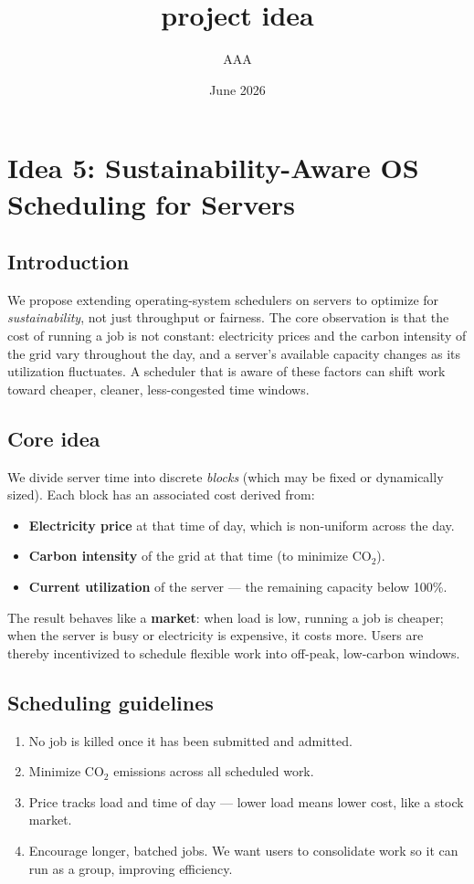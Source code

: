 \documentclass{article}
\title{project idea}
\author{AAA }
\date{June 2026}
\begin{document}
\section{Idea 5: Sustainability-Aware OS Scheduling for Servers}

\subsection*{Introduction}
We propose extending operating-system schedulers on servers to optimize for
\emph{sustainability}, not just throughput or fairness. The core observation is that the cost
of running a job is not constant: electricity prices and the carbon intensity of the grid
vary throughout the day, and a server's available capacity changes as its utilization
fluctuates. A scheduler that is aware of these factors can shift work toward cheaper,
cleaner, less-congested time windows.

\subsection*{Core idea}
We divide server time into discrete \emph{blocks} (which may be fixed or dynamically sized).
Each block has an associated cost derived from:
\begin{itemize}
\item \textbf{Electricity price} at that time of day, which is non-uniform across the day.
\item \textbf{Carbon intensity} of the grid at that time (to minimize CO$_2$).
\item \textbf{Current utilization} of the server --- the remaining capacity below 100\%.
\end{itemize}

\noindent The result behaves like a \textbf{market}: when load is low, running a job is
cheaper; when the server is busy or electricity is expensive, it costs more. Users are
thereby incentivized to schedule flexible work into off-peak, low-carbon windows.

\subsection*{Scheduling guidelines}
\begin{enumerate}
\item No job is killed once it has been submitted and admitted.
\item Minimize CO$_2$ emissions across all scheduled work.
\item Price tracks load and time of day --- lower load means lower cost, like a stock market.
\item Encourage longer, batched jobs. We want users to consolidate work so it can run as a
group, improving efficiency.
\end{enumerate}
\end{document}
